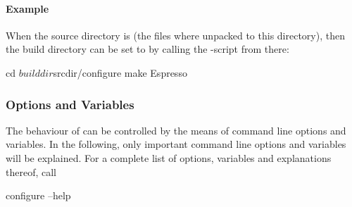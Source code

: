 \paragraph{Example}
When the source directory is  (\ie the files where
unpacked to this directory), then the build directory can be set to
 by calling the -script from
there:
\begin{code}
cd $builddir
$srcdir/configure
make
Espresso
\end{code}

\subsubsection{Options and Variables}
\label{ssec:configureoptions}

 The behaviour of  can be
controlled by the means of command line options and variables.  In the
following, only important command line options and variables \es will
be explained.  For a complete list of options, variables and
explanations thereof, call
\begin{code}
configure --help
\end{code}

